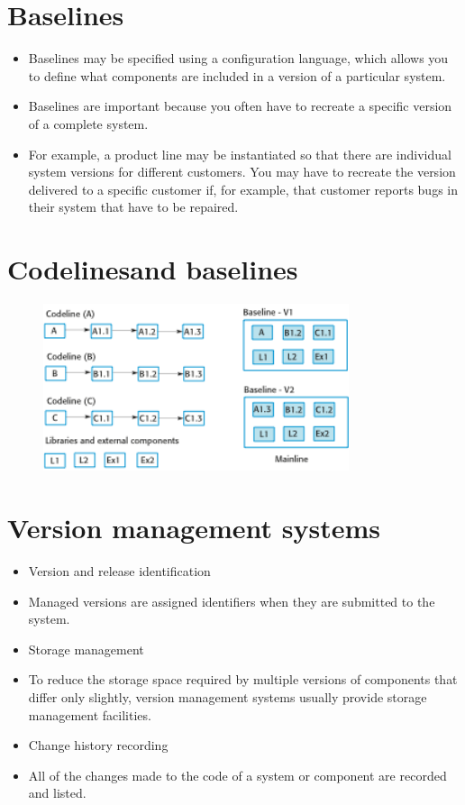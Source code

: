 \section{Baselines}
\begin{itemize}
\item Baselines may be specified using a configuration language, which allows you to define what components are included in a version of a particular system.

\item Baselines are important because you often have to recreate a specific version of a complete system.

   \item For example, a product line may be instantiated so that there are individual system versions for different customers. You may have to recreate the version delivered to a specific customer if, for example, that customer reports bugs in their system that have to be repaired.
\end{itemize}

\section{Codelinesand baselines}
\begin{figure}[h!]
    \centering
    \includegraphics[width = 0.8\textwidth]{./figures/L8_3.png}
    \caption{}
    \label{fig:L8_3}
\end{figure}
\section{Version management systems}
\begin{itemize}

\item Version and release identification

   \item Managed versions are assigned identifiers when they are submitted to the system.

\item Storage management

   \item To reduce the storage space required by multiple versions of components that differ only slightly, version management systems usually provide storage management facilities.

\item Change history recording

   \item All of the changes made to the code of a system or component are recorded and listed.

\end{itemize}
